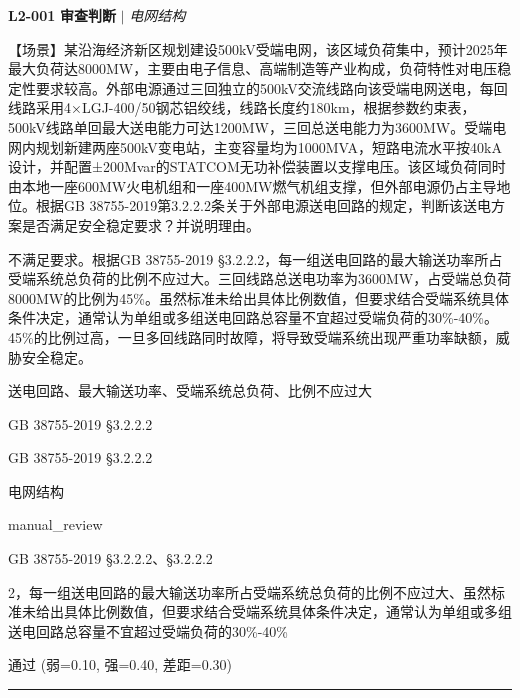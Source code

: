 \documentclass[11pt,a4paper]{ctexart}
\begin{document}
\noindent\textbf{L2-001} \hfill \textbf{审查判断} $|$ \textit{电网结构}
\begin{description}[leftmargin=1.5em,style=nextline,font=\normalfont]
  \item[Q:] 【场景】某沿海经济新区规划建设500kV受端电网，该区域负荷集中，预计2025年最大负荷达8000MW，主要由电子信息、高端制造等产业构成，负荷特性对电压稳定性要求较高。外部电源通过三回独立的500kV交流线路向该受端电网送电，每回线路采用4×LGJ-400/50钢芯铝绞线，线路长度约180km，根据参数约束表，500kV线路单回最大送电能力可达1200MW，三回总送电能力为3600MW。受端电网内规划新建两座500kV变电站，主变容量均为1000MVA，短路电流水平按40kA设计，并配置±200Mvar的STATCOM无功补偿装置以支撑电压。该区域负荷同时由本地一座600MW火电机组和一座400MW燃气机组支撑，但外部电源仍占主导地位。根据GB 38755-2019第3.2.2.2条关于外部电源送电回路的规定，判断该送电方案是否满足安全稳定要求？并说明理由。
  \item[A:] 不满足要求。根据GB 38755-2019 §3.2.2.2，每一组送电回路的最大输送功率所占受端系统总负荷的比例不应过大。三回线路总送电功率为3600MW，占受端总负荷8000MW的比例为45\%。虽然标准未给出具体比例数值，但要求结合受端系统具体条件决定，通常认为单组或多组送电回路总容量不宜超过受端负荷的30\%-40\%。45\%的比例过高，一旦多回线路同时故障，将导致受端系统出现严重功率缺额，威胁安全稳定。
  \item[KW:] 送电回路、最大输送功率、受端系统总负荷、比例不应过大
  \item[标准:] GB 38755-2019 §3.2.2.2
  \item[条款溯源:] GB 38755-2019 §3.2.2.2
  \item[主题:] 电网结构
  \item[评分方式:] manual\_review
  \item[Rubric条款:] GB 38755-2019 §3.2.2.2、§3.2.2.2
  \item[Rubric判据:] 2，每一组送电回路的最大输送功率所占受端系统总负荷的比例不应过大、虽然标准未给出具体比例数值，但要求结合受端系统具体条件决定，通常认为单组或多组送电回路总容量不宜超过受端负荷的30\%-40\%
  \item[LJ判定:] 通过 (弱=0.10, 强=0.40, 差距=0.30)
\end{description}
\vspace{4pt}
\hrule
\vspace{6pt}
\end{document}
